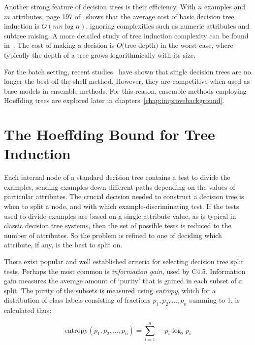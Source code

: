 Another strong feature of decision trees is their efficiency.
With $n$ examples and $m$ attributes, page 197 of~\cite{weka} shows that the average cost of basic decision tree induction is $O(mn \log n)$, ignoring complexities such as numeric attributes and subtree raising. A more detailed study of tree induction complexity can be found in~\cite{dtcomplexity}.
The cost of making a decision is $O($tree depth$)$ in the worst case, where typically the depth of a tree grows logarithmically with its size.

For the batch setting, recent studies~\cite{mlcomparison} have shown that single decision trees are no longer the best off-the-shelf method. However, they are competitive when used as base models in ensemble methods. 
For this reason, ensemble methods employing Hoeffding trees are explored later in chapters~\ref{chap:improvebackground}. %

\section{The Hoeffding Bound for Tree Induction}
\label{sec:hoeffdingbounds}

Each internal node of a standard decision tree contains a test to divide the examples, sending examples down different paths depending on the values of particular attributes. 
The crucial decision needed to construct a decision tree is when to split a node, and with which example-discriminating test.        
If the tests used to divide examples are based on a single attribute value, as is typical in classic decision tree systems, then the set of possible tests is reduced to the number of attributes.
So the problem is refined to one of deciding which attribute, if any, is the best to split on.

There exist popular and well established criteria for selecting decision tree split tests. 
Perhaps the most common is {\it information gain}, used by C4.5.
Information gain measures the average amount of `purity' that is gained in each subset of a split. The purity of the subsets is measured using {\em entropy}, which for a distribution of class labels consisting of fractions ${p}_{1},{p}_{2},...,{p}_{n}$ summing to 1, is calculated thus:

\begin{equation} \label{eq:entropy}
\mathrm{entropy}({p}_{1},{p}_{2},...,{p}_{n}) = \sum_{i=1}^{n} -{p}_{i} \log_{2} {p}_{i}
\end{equation}

